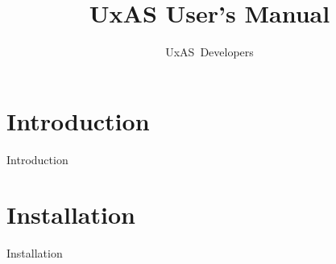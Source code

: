 \documentclass{tufte-book} %
\title{UxAS User's Manual} %
\author[UxAS Developers]{UxAS\ Developers} %
\begin{document}
	
\frontmatter

	



\maketitle %


\tableofcontents %


\listoffigures %









\chapter{Introduction}
\newcommand{\FiguresPath}{./Introduction/figures}
{Introduction}


\chapter{Installation}
\renewcommand{\FiguresPath}{./Installation/figures}
{Installation}

\end{document}
